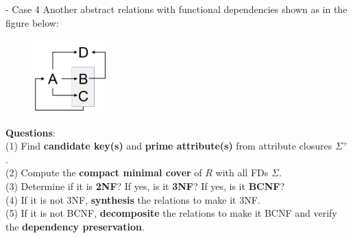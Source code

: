 \begin{frame}[fragile]{ - Case 4}
	Another abstract relations with functional dependencies shown as in the figure below:\\\vspace{-5pt}
	
	\begin{figure}
		\includegraphics[width=0.25\textwidth, trim=0 0 0 0, clip]{t5/images/case4.png}
	\end{figure}\vspace{-5pt}
	
	\textbf{Questions}:\\
	(1) Find \textbf{candidate key(s)} and \textbf{prime attribute(s)} from attribute closures $\Sigma^{+}$.\\
	(2) Compute the \textbf{compact minimal cover} of $R$ with all FDs $\Sigma$.\\
	(3) Determine if it is \textbf{2NF}? If yes, is it \textbf{3NF}? If yes, is it \textbf{BCNF}?\\
	(4) If it is not 3NF, \textbf{synthesis} the relations to make it 3NF.\\
	(5) If it is not BCNF, \textbf{decomposite} the relations to make it BCNF and verify the \textbf{dependency preservation}. 
\end{frame}

